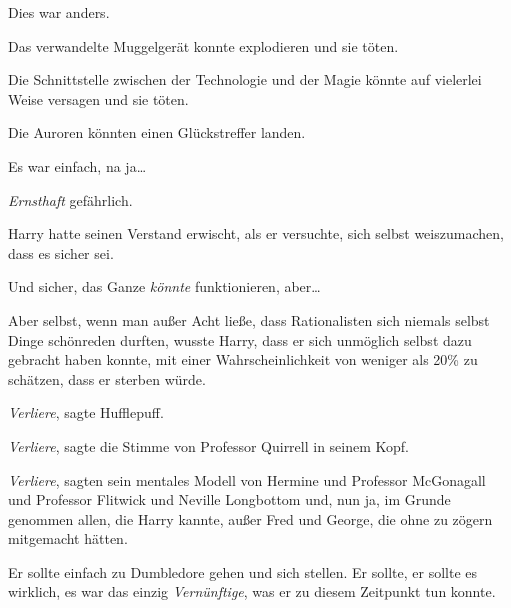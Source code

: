 Dies war anders.

Das verwandelte Muggelgerät konnte explodieren und sie töten.

Die Schnittstelle zwischen der Technologie und der Magie könnte auf vielerlei Weise versagen und sie töten.

Die Auroren könnten einen Glückstreffer landen.

Es war einfach, na ja…

\emph{Ernsthaft} gefährlich.

Harry hatte seinen Verstand erwischt, als er versuchte, sich selbst weiszumachen, dass es sicher sei.

Und sicher, das Ganze \emph{könnte} funktionieren, aber…

Aber selbst, wenn man außer Acht ließe, dass Rationalisten sich niemals selbst Dinge schönreden durften, wusste Harry, dass er sich unmöglich selbst dazu gebracht haben konnte, mit einer Wahrscheinlichkeit von weniger als 20\% zu schätzen, dass er sterben würde.

\emph{Verliere}, sagte Hufflepuff.

\emph{Verliere}, sagte die Stimme von Professor Quirrell in seinem Kopf.

\emph{Verliere}, sagten sein mentales Modell von Hermine und Professor McGonagall und Professor Flitwick und Neville Longbottom und, nun ja, im Grunde genommen allen, die Harry kannte, außer Fred und George, die ohne zu zögern mitgemacht hätten.

Er sollte einfach zu Dumbledore gehen und sich stellen. Er sollte, er sollte es wirklich, es war das einzig \emph{Vernünftige}, was er zu diesem Zeitpunkt tun konnte.

